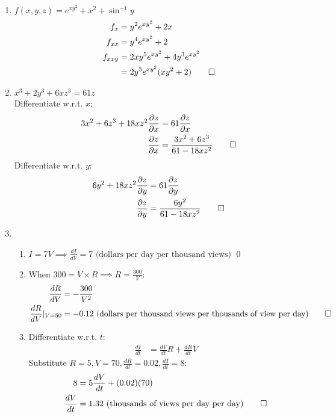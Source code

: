 \documentclass[12pt, a4paper]{article}
\begin{document}
\begin{enumerate}[Q\arabic*.]
  \item $f(x,y,z) = e^{xy^2} + x^2 + \sin^{-1} y$
    \begin{align*}
      f_x &= y^2e^{xy^2} + 2x\\
      f_{xx} &= y^4e^{xy^2} + 2\\
      f_{xxy} &= 2xy^5e^{xy^2} + 4y^3e^{xy^2}\\
              &= 2y^3e^{xy^2}(xy^2 + 2)\qed
    \end{align*}

  \item $x^3 + 2y^3 + 6xz^3 = 61z$\\
    Differentiate w.r.t. $x$:
    \begin{align*}
      3x^2 + 6z^3 + 18xz^2 \frac{\partial z}{\partial x} &= 61 \frac{\partial z}{\partial x}\\
      \frac{\partial z}{\partial x} &= \frac{3x^2 + 6z^3}{61 - 18xz^2} \qed
    \end{align*}
    Differentiate w.r.t. $y$:
    \begin{align*}
      6y^2 + 18xz^2 \frac{\partial z}{\partial y} &= 61 \frac{\partial z}{\partial y}\\
      \frac{\partial z}{\partial y} &= \frac{6y^2}{61-18xz^2} \qed
    \end{align*}

  \pagebreak
  \item 
    \begin{enumerate}[(\alph*)]
      \item $I = 7V \implies \frac{dI}{dV} = 7 \text{ (dollars per day per thousand views)}$ \qed
      \item When $300 = V \times R \implies R = \frac{300}{V}$:
        \begin{align*}
          \frac{dR}{dV} &= -\frac{300}{V^2}\\
          \frac{dR}{dV}|_{V=50} &= -0.12\text{ (dollars per thousand views per thousands of view per day)}\qed
        \end{align*}
      \item Differentiate w.r.t. $t$:
        \begin{align*}
          \frac{dI}{dt} &= \frac{dV}{dt}R + \frac{dR}{dt}V
        \end{align*}
        Substitute $R = 5, V = 70, \frac{dR}{dt} = 0.02, \frac{dI}{dt} = 8$:
        \begin{align*}
          8 &= 5\frac{dV}{dt} + (0.02)(70)\\
          \frac{dV}{dt} &= 1.32\text{ (thousands of views per day per day)} \qed
        \end{align*}
    \end{enumerate}


\end{enumerate}
\end{document}
